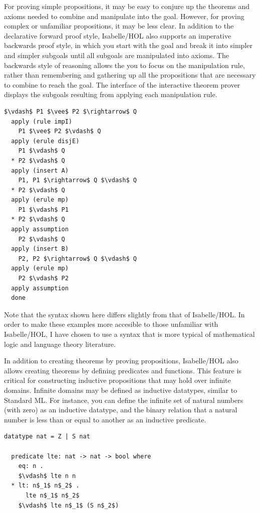 \documentclass[letterpaper, 11pt]{extarticle}
\begin{document}
For proving simple propositions, it may be easy to conjure up the theorems and axioms needed to
combine and manipulate into the goal. However, for proving complex or unfamiliar propositions,
it may be less clear. In addition to the declarative forward proof style, Isabelle/HOL also
supports an imperative backwards proof style, in which you start with the goal and break it into simpler
and simpler subgoals until all subgoals are manipulated into axioms. The backwards style of reasoning
allows the you to focus on the manipulation rule, rather than remembering and gathering up all the
propositions that are necessary to combine to reach the goal.
The interface of the interactive theorem prover displays the subgoals
resulting from applying each manipulation rule.


\begin{lstlisting}[language=logic, mathescape]
  $\vdash$ P1 $\vee$ P2 $\rightarrow$ Q
  apply (rule impI)
    P1 $\vee$ P2 $\vdash$ Q
  apply (erule disjE)
    P1 $\vdash$ Q
  * P2 $\vdash$ Q
  apply (insert A)
    P1, P1 $\rightarrow$ Q $\vdash$ Q
  * P2 $\vdash$ Q
  apply (erule mp)
    P1 $\vdash$ P1
  * P2 $\vdash$ Q
  apply assumption 
    P2 $\vdash$ Q
  apply (insert B)
    P2, P2 $\rightarrow$ Q $\vdash$ Q
  apply (erule mp)
    P2 $\vdash$ P2
  apply assumption 
  done
\end{lstlisting}

Note that the syntax shown here differs slightly from that of Isabelle/HOL.
In order to make these examples more accesible to those unfamiliar with Isabelle/HOL, I have chosen
to use a syntax that is more typical of mathematical logic and language theory literature.

In addition to creating theorems by proving propositions, Isabelle/HOL also allows creating theorems
by defining predicates and functions. This feature is critical for constructing inductive propositions that may hold
over infinite domains. Infinite domains may be defined as inductive datatypes, similar to Standard ML.
For instance, you can define the infinite set of natural numbers (with zero) as an inductive datatype,
and the binary relation that a natural number is less than or equal to another as an inductive predicate.

\begin{lstlisting}[language=logic]
  datatype nat = Z | S nat
  
  predicate lte: nat -> nat -> bool where
    eq: n . 
    $\vdash$ lte n n
  * lt: n$_1$ n$_2$ . 
      lte n$_1$ n$_2$ 
    $\vdash$ lte n$_1$ (S n$_2$)
\end{lstlisting}
\end{document}
